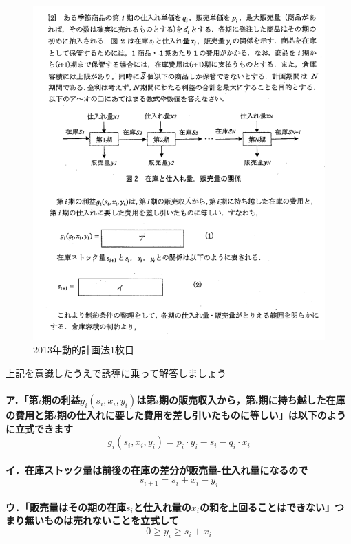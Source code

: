 \documentclass{jsarticle}
\begin{document}
\begin{figure}[htbp]
  \includegraphics[keepaspectratio, width=16cm]{figures/dynamic20131.png}
  \caption{2013年動的計画法1枚目\label{dynamic20131}}
\end{figure}

\pagebreak

上記を意識したうえで誘導に乗って解答しましょう
\paragraph{ア．「第$i$期の利益$g_i(s_i,x_i,y_i)$は第$i$期の販売収入から，第$i$期に持ち越した在庫の費用と第$i$期の仕入れに要した費用を差し引いたものに等しい」は以下のように立式できます$$g_i(s_i,x_i,y_i)=p_i\cdot y_i-s_i-q_i\cdot x_i$$}
\paragraph{イ．在庫ストック量は前後の在庫の差分が販売量-仕入れ量になるので$$s_{i+1}=s_i+x_i-y_i$$}
\paragraph{ウ．「販売量はその期の在庫$s_i$と仕入れ量の$x_i$の和を上回ることはできない」つまり無いものは売れないことを立式して$$0 \ge y_i \ge s_i+x_i$$}
\end{document}
